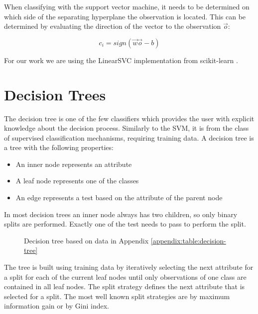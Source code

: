 \documentclass[pdftex,12pt,a4paper]{report}
\begin{document}
When classifying with the support vector machine, it needs to be determined on which side of the separating hyperplane the observation is located. This can be determined by evaluating the direction of the vector to the observation $\vec{o}$:

\begin{equation}
c_i = sign(\vec{w} \vec{o} - b)
\end{equation}

For our work we are using the LinearSVC implementation from scikit-learn \cite{pedregosa2011scikit}.

\section{Decision Trees}
\label{sec:basics-decision-trees}

The decision tree is one of the few classifiers which provides the user with explicit knowledge about the decision process. Similarly to the SVM, it is from the class of supervised classification mechanisms, requiring training data. A decision tree is a tree with the following properties:

\begin{itemize}
	\item An inner node represents an attribute
	\item A leaf node represents one of the classes
	\item An edge represents a test based on the attribute of the parent node
\end{itemize}

In most decision trees an inner node always has two children, so only binary splits are performed. Exactly one of the test needs to pass to perform the split.

\begin{figure}[h]
	\centering
	\begin{subfigure}[b]{0.65\textwidth}
		\centering
		
	\end{subfigure}
	\caption{Decision tree based on data in Appendix \ref{appendix:table:decision-tree}}
	\label{fig:basics-decision-tree}
\end{figure}

The tree is built using training data by iteratively selecting the next attribute for a split for each of the current leaf nodes until only observations of one class are contained in all leaf nodes. The split strategy defines the next attribute that is selected for a split. The most well known split strategies are by maximum information gain or by Gini index.
\end{document}
